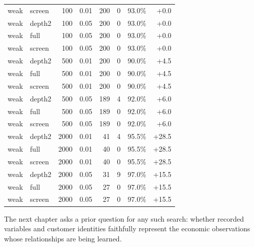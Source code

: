 \begin{longtable}{llrrrrrr}
weak & screen & 100 & 0.01 & 200 & 0 & 93.0\% & +0.0\\
weak & depth2 & 100 & 0.05 & 200 & 0 & 93.0\% & +0.0\\
weak & full & 100 & 0.05 & 200 & 0 & 93.0\% & +0.0\\
weak & screen & 100 & 0.05 & 200 & 0 & 93.0\% & +0.0\\
weak & depth2 & 500 & 0.01 & 200 & 0 & 90.0\% & +4.5\\
weak & full & 500 & 0.01 & 200 & 0 & 90.0\% & +4.5\\
weak & screen & 500 & 0.01 & 200 & 0 & 90.0\% & +4.5\\
weak & depth2 & 500 & 0.05 & 189 & 4 & 92.0\% & +6.0\\
weak & full & 500 & 0.05 & 189 & 0 & 92.0\% & +6.0\\
weak & screen & 500 & 0.05 & 189 & 0 & 92.0\% & +6.0\\
weak & depth2 & 2000 & 0.01 & 41 & 4 & 95.5\% & +28.5\\
weak & full & 2000 & 0.01 & 40 & 0 & 95.5\% & +28.5\\
weak & screen & 2000 & 0.01 & 40 & 0 & 95.5\% & +28.5\\
weak & depth2 & 2000 & 0.05 & 31 & 9 & 97.0\% & +15.5\\
weak & full & 2000 & 0.05 & 27 & 0 & 97.0\% & +15.5\\
weak & screen & 2000 & 0.05 & 27 & 0 & 97.0\% & +15.5\\
\bottomrule\end{longtable}
\endgroup

The next chapter asks a prior question for any such search: whether recorded
variables and customer identities faithfully represent the economic observations
whose relationships are being learned.


